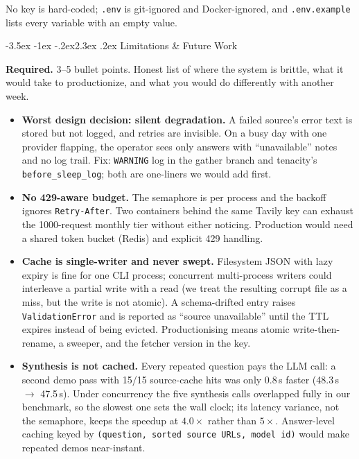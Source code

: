 \documentclass[11pt,a4paper]{article}
\makeatletter
\renewcommand\section{\@startsection{section}{1}{\z@}%
    {-3.5ex \@plus -1ex \@minus -.2ex}{2.3ex \@plus .2ex}%
    {\normalfont\Large\bfseries\color{accent}}}%
\makeatother
\begin{document}
No key is hard-coded; \texttt{.env} is git-ignored and Docker-ignored, and \texttt{.env.example} lists every variable with an empty value.

\section{Limitations \& Future Work}\label{sec:limits}

\begin{deliverbox}
\textbf{Required.} 3--5 bullet points. Honest list of where the system is brittle, what it would take to productionize, and what you would do differently with another week.
\end{deliverbox}

\begin{itemize}[leftmargin=1.4em,itemsep=3pt]
  \item \textbf{Worst design decision: silent degradation.} A failed source's error text is stored but not logged, and retries are invisible. On a busy day with one provider flapping, the operator sees only answers with ``unavailable'' notes and no log trail. Fix: \texttt{WARNING} log in the gather branch and tenacity's \texttt{before\_sleep\_log}; both are one-liners we would add first.
  \item \textbf{No 429-aware budget.} The semaphore is per process and the backoff ignores \texttt{Retry-After}. Two containers behind the same Tavily key can exhaust the 1000-request monthly tier without either noticing. Production would need a shared token bucket (Redis) and explicit 429 handling.
  \item \textbf{Cache is single-writer and never swept.} Filesystem JSON with lazy expiry is fine for one CLI process; concurrent multi-process writers could interleave a partial write with a read (we treat the resulting corrupt file as a miss, but the write is not atomic). A schema-drifted entry raises \texttt{ValidationError} and is reported as ``source unavailable'' until the TTL expires instead of being evicted. Productionising means atomic write-then-rename, a sweeper, and the fetcher version in the key.
  \item \textbf{Synthesis is not cached.} Every repeated question pays the LLM call: a second demo pass with 15/15 source-cache hits was only 0.8\,s faster (48.3\,s $\to$ 47.5\,s). Under concurrency the five synthesis calls overlapped fully in our benchmark, so the slowest one sets the wall clock; its latency variance, not the semaphore, keeps the speedup at $4.0\times$ rather than $5\times$. Answer-level caching keyed by \texttt{(question, sorted source URLs, model id)} would make repeated demos near-instant.

\end{itemize}
\end{document}
